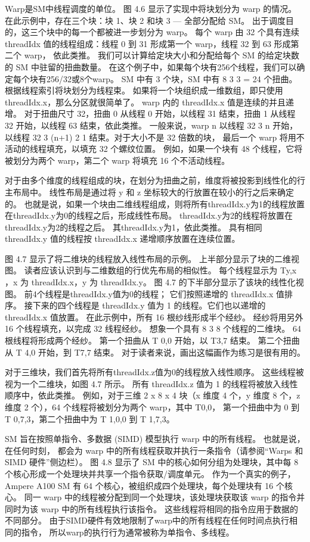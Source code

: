 Warp是SM中线程调度的单位。 图 4.6 显示了实现中将块划分为 warp 的情况。 
在此示例中，存在三个块：块 1、块 2 和块 3 — 全部分配给 SM。 出于调度目的，这三个块中的每一个都被进一步划分为 warp。 
每个 warp 由 32 个具有连续 threadIdx 值的线程组成：线程 0 到 31 形成第一个 warp，线程 32 到 63 形成第二个 warp，
依此类推。 我们可以计算给定块大小和分配给每个 SM 的给定块数的 SM 中驻留的扭曲数量。 
在这个例子中，如果每个块有256个线程，我们可以确定每个块有256/32或8个warp。 
SM 中有 3 个块，SM 中有 8 3 3 = 24 个扭曲。 根据线程索引将块划分为线程束。 
如果将一个块组织成一维数组，即只使用threadIdx.x，那么分区就很简单了。 warp 内的 threadIdx.x 值是连续的并且递增。 
对于扭曲尺寸 32，扭曲 0 从线程 0 开始，以线程 31 结束，扭曲 1 从线程 32 开始，以线程 63 结束，依此类推。 
一般来说，warp n 以线程 32 3 n 开始，以线程 32 3 (n+1) 2 1 结束。对于大小不是 32 倍数的块，
最后一个 warp 将用不活动的线程填充，以填充 32 个螺纹位置。 
例如，如果一个块有 48 个线程，它将被划分为两个 warp，第二个 warp 将填充 16 个不活动线程。

对于由多个维度的线程组成的块，在划分为扭曲之前，维度将被投影到线性化的行主布局中。 
线性布局是通过将 y 和 z 坐标较大的行放置在较小的行之后来确定的。 
也就是说，如果一个块由二维线程组成，则将所有threadIdx.y为1的线程放置在threadIdx.y为0的线程之后，形成线性布局。
threadIdx.y为2的线程将放置在threadIdx.y为2的线程之后。 其threadIdx.y为1，依此类推。 
具有相同 threadIdx.y 值的线程按 threadIdx.x 递增顺序放置在连续位置。

图 4.7 显示了将二维块的线程放入线性布局的示例。 上半部分显示了块的二维视图。 
读者应该认识到与二维数组的行优先布局的相似性。 每个线程显示为 Ty,x ，x 为 threadIdx.x，y 为 threadIdx.y。 
图 4.7 的下半部分显示了该块的线性化视图。 前4个线程是threadIdx.y值为0的线程； 它们按照递增的 threadIdx.x 值排序。 
接下来的四个线程是 threadIdx.y 值为 1 的线程。它们也以递增的 threadIdx.x 值放置。 
在此示例中，所有 16 根纱线形成半个经纱。 经纱将用另外 16 个线程填充，以完成 32 线程经纱。 
想象一个具有 8 3 8 个线程的二维块。 64 根线程将形成两个经纱。 第一个扭曲从 T 0,0 开始，以 T3,7 结束。 
第二个扭曲从 T 4,0 开始，到 T7,7 结束。 对于读者来说，画出这幅画作为练习是很有用的。

对于三维块，我们首先将所有threadIdx.z值为0的线程放入线性顺序。 这些线程被视为一个二维块，如图 4.7 所示。 
所有 threadIdx.z 值为 1 的线程将被放入线性顺序中，依此类推。 
例如，对于三维 2 x 8 x 4 块（x 维度 4 个，y 维度 8 个，z 维度 2 个），64 个线程将被划分为两个 warp，其中 T0,0， 
第一个扭曲中为 0 到 T 0,7,3，第二个扭曲中为 T 1,0,0 到 T 1,7,3。

SM 旨在按照单指令、多数据 (SIMD) 模型执行 warp 中的所有线程。 也就是说，在任何时刻，
都会为 warp 中的所有线程获取并执行一条指令（请参阅“Warps 和 SIMD 硬件”侧边栏）。 
图 4.8 显示了 SM 中的核心如何分组为处理块，其中每 8 个核心形成一个处理块并共享一个指令获取/调度单元。 
作为一个真实的例子，Ampere A100 SM 有 64 个核心，被组织成四个处理块，每个处理块有 16 个核心。 
同一 warp 中的线程被分配到同一个处理块，该处理块获取该 warp 的指令并同时为该 warp 中的所有线程执行该指令。 
这些线程将相同的指令应用于数据的不同部分。 由于SIMD硬件有效地限制了warp中的所有线程在任何时间点执行相同的指令，
所以warp的执行行为通常被称为单指令、多线程。

